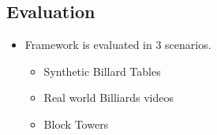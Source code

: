 \documentclass{article}
\begin{document}
    \subsection{Evaluation}\label{subsec:Learning_to_See_Physics_via_Visual_De_animation:evaluation}
    \begin{itemize}
        \item Framework is evaluated in 3 scenarios.
        \begin{itemize}
            \item Synthetic Billard Tables
            \item Real world Billiards videos
            \item Block Towers
        \end{itemize}
    \end{itemize}
\end{document}
